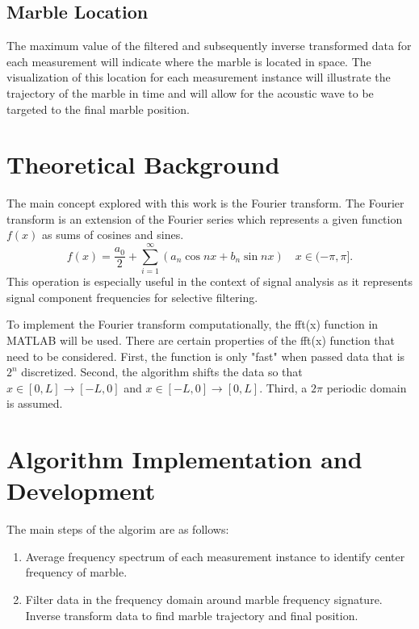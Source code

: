 \documentclass{article}
\begin{document}
\subsection{Marble Location}
The maximum value of the filtered and subsequently inverse transformed data for each measurement will indicate where the marble is located in space. The visualization of this location for each measurement instance will illustrate the trajectory of the marble in time and will allow for the acoustic wave to be targeted to the final marble position.

\section{Theoretical Background}
The main concept explored with this work is the Fourier transform. The Fourier transform is an extension of the Fourier series which represents a given function $f(x)$ as sums of cosines and sines. 
\begin{equation}
    f(x) = \frac{a_0}{2} + \sum_{i=1}^\infty \left(a_n\cos{nx} + b_n\sin{nx}\right) \quad x \in (-\pi,\pi].
    \label{eqn:fourierseries}
\end{equation}
This operation is especially useful in the context of signal analysis as it represents signal component frequencies for selective filtering.

To implement the Fourier transform computationally, the fft(x) function in MATLAB will be used. There are certain properties of the fft(x) function that need to be considered. First, the function is only "fast" when passed data that is $2^{n}$ discretized. Second, the algorithm shifts the data so that $x \in [0, L] \rightarrow [−L, 0]$ and $x \in [−L, 0] \rightarrow [0, L]$. Third, a $2\pi$  periodic domain is assumed.

\section{Algorithm Implementation and Development}
The main steps of the algorim are as follows: 
\begin{enumerate}
    \item Average frequency spectrum of each measurement instance to identify center frequency of marble.
    \item Filter data in the frequency domain around marble frequency signature. Inverse transform data to find marble trajectory and final position.
\end{enumerate}
\end{document}
